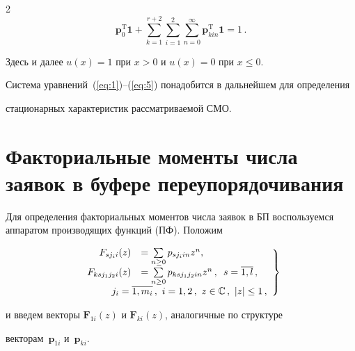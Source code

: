 \begin{multicols}{2}
\begin{equation}
\label{eq:5}

\boldsymbol{p}_0^{\mathrm{T}}\boldsymbol{1}+

\sum\limits_{k=1}^{r+2}\sum\limits_{i=1}^2\sum\limits_{n=0}^{\infty}

\boldsymbol{p}_{kin}^{\mathrm{T}}\boldsymbol{1}=1\,.

\end{equation}

Здесь и далее $u(x)=1$ при $x>0$ и $u(x)=0$ при $x\leq 0$.



Система уравнений~(\ref{eq:1})--(\ref{eq:5}) понадобится в дальнейшем для определения 

стационарных характеристик рассматриваемой СМО.



\section{Факториальные моменты числа заявок в буфере переупорядочивания}



Для определения факториальных моментов числа заявок в БП воспользуемся аппаратом производящих функций (ПФ). Положим

\begin{equation}

\left.

\begin{array}{rl}

 F_{sj_ii}(z)&=\sum\limits_{n\geq 0}p_{sj_iin}z^n,\\[6pt]

 F_{ksj_1j_2i}(z)&=\sum\limits_{n\geq 0}p_{ks j_1j_2in}z^n\,,\enskip s=\overline{1,l}\,,\\

 &\!\!\!\!\!\!\!\!\!\!\!\!\!\!\!\!\!\! j_i=\overline{1,m_i}\,,\  i=1,2\,,\  z\in\mathbb{C}\,,\ |z|\leq 1\,,

\end{array}

\right \}

\label{eq:6}

\end{equation}

и введем векторы $\boldsymbol{F}_{1i}(z)$ и $\boldsymbol{F}_{ki}(z)$, аналогичные по структуре 

векторам~$\boldsymbol{p}_{1i}$ и~$\boldsymbol{p}_{ki}$.






\end{multicols}
